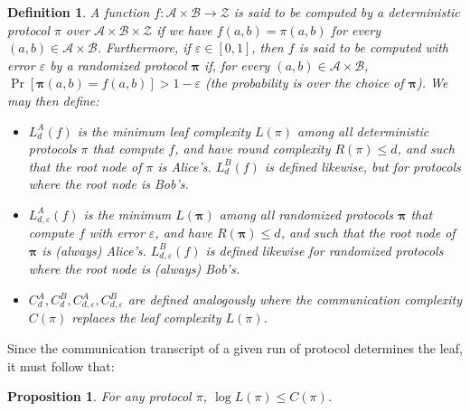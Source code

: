 \documentclass[10pt,a4paper]{article}
\newtheorem{definition}[theorem]{Definition}
\newtheorem{proposition}[theorem]{Proposition}
\begin{document}
\begin{definition}
A function $f:\mathcal A\times\mathcal B\to\mathcal Z$ is said to be computed by a deterministic protocol $\pi$ over $\mathcal A\times\mathcal B\times\mathcal Z$ if we have $f(a,b)=\pi(a,b)$ for every $(a,b)\in\mathcal A\times\mathcal B$. Furthermore, if $\varepsilon\in[0,1]$, then $f$ is said to be computed with error $\varepsilon$ by a randomized protocol $\boldsymbol\pi$ if, for every $(a,b)\in\mathcal A\times\mathcal B$, $\Pr[\boldsymbol\pi(a,b)=f(a,b)]>1-\varepsilon$ (the probability is over the choice of $\boldsymbol\pi$).
We may then define:
\begin{itemize}
\item $L_d^A(f)$ is the minimum leaf complexity $L(\pi)$ among all deterministic protocols $\pi$ that compute $f$, and have round complexity $R(\pi)\le d$, and such that the root node of $\pi$ is Alice's. $L_d^B(f)$ is defined likewise, but for protocols where the root node is Bob's.
\item $L_{d,\varepsilon}^A(f)$ is the minimum $L(\boldsymbol\pi)$ among all randomized protocols $\boldsymbol\pi$ that compute $f$ with error $\varepsilon$, and have $R(\boldsymbol\pi)\le d$, and such that the root node of $\boldsymbol\pi$ is (always) Alice's. $L_{d,\varepsilon}^B(f)$ is defined likewise for randomized protocols where the root node is (always) Bob's.
\item $C_d^A,C_d^B,C_{d,\varepsilon}^A,C_{d,\varepsilon}^B$ are defined analogously where the communication complexity $C(\pi)$ replaces the leaf complexity $L(\pi)$.
\end{itemize}
\end{definition}
Since the communication transcript of a given run of protocol determines the leaf, it must follow that:
\begin{proposition} For any protocol $\pi$, $\log L(\pi)\le C(\pi)$.\end{proposition}
\end{document}

